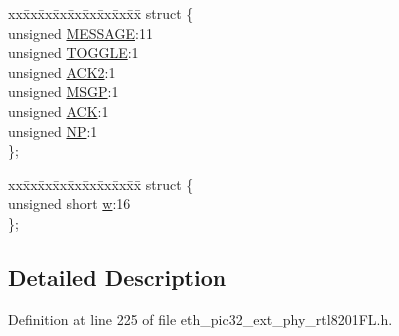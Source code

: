 \begin{DoxyCompactItemize}
\begin{tabbing}
\end{tabbing}\item 
\begin{tabbing}
xx\=xx\=xx\=xx\=xx\=xx\=xx\=xx\=xx\=\kill
struct \{\\
\>unsigned \hyperlink{union_____a_n_l_p_a_d_n_pbits__t_a06361005f0d2faefe34e0bdb1499bfe7}{MESSAGE}:11\\
\>unsigned \hyperlink{union_____a_n_l_p_a_d_n_pbits__t_ab4110904eded0b4b6a2280a6b4b9f4c2}{TOGGLE}:1\\
\>unsigned \hyperlink{union_____a_n_l_p_a_d_n_pbits__t_a04eefaff71d440a3996c7db3676475ba}{ACK2}:1\\
\>unsigned \hyperlink{union_____a_n_l_p_a_d_n_pbits__t_a8c958300dd9e82d064f59696a78d8e45}{MSGP}:1\\
\>unsigned \hyperlink{union_____a_n_l_p_a_d_n_pbits__t_a9d5913829bb2b681dc6257fc7e9b7a56}{ACK}:1\\
\>unsigned \hyperlink{union_____a_n_l_p_a_d_n_pbits__t_ac89729be1dc289730931f8238a316516}{NP}:1\\
\}; \\

\end{tabbing}\item 
\begin{tabbing}
xx\=xx\=xx\=xx\=xx\=xx\=xx\=xx\=xx\=\kill
struct \{\\
\>unsigned short \hyperlink{union_____a_n_l_p_a_d_n_pbits__t_a160850a4684a3e82c2323033964f2e98}{w}:16\\
\}; \\

\end{tabbing}\end{DoxyCompactItemize}


\subsection{Detailed Description}


Definition at line 225 of file eth\+\_\+pic32\+\_\+ext\+\_\+phy\+\_\+rtl8201\+F\+L.\+h.



